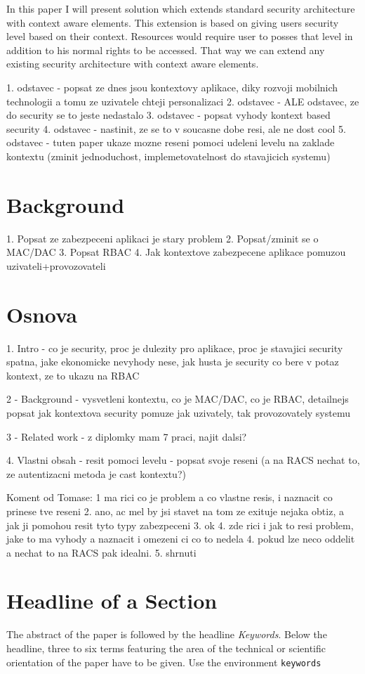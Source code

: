 \documentclass{poster15}
\begin{document}
In this paper I will present solution which extends standard security architecture with context aware elements. This extension is based on giving users security level based on their context. Resources would require user to posses that level in addition to his normal rights to be accessed. That way we can extend any existing security architecture with context aware elements.

1. odstavec - popsat ze dnes jsou kontextovy aplikace, diky rozvoji mobilnich technologii a tomu ze uzivatele chteji personalizaci
2. odstavec - ALE odstavec, ze do security se to jeste nedastalo
3. odstavec - popsat vyhody kontext based security
4. odstavec - nastinit, ze se to v soucasne dobe resi, ale ne dost cool
5. odstavec - tuten paper ukaze mozne reseni pomoci udeleni levelu na zaklade kontextu (zminit jednoduchost, implemetovatelnost do stavajicich systemu)

\section{Background}
1. Popsat ze zabezpeceni aplikaci je stary problem
2. Popsat/zminit se o MAC/DAC 
3. Popsat RBAC
4. Jak kontextove zabezpecene aplikace pomuzou uzivateli+provozovateli

\section{Osnova}
1. Intro - co je security, proc je dulezity pro aplikace, proc je stavajici security spatna, jake ekonomicke nevyhody nese, jak husta je security co bere v potaz kontext, ze to ukazu na RBAC

2 - Background - vysvetleni kontextu, co je MAC/DAC, co je RBAC, detailnejs popsat jak kontextova security pomuze jak uzivately, tak provozovately systemu

3 - Related work - z diplomky mam 7 praci, najit dalsi?

4. Vlastni obsah - resit pomoci levelu - popsat svoje reseni (a na RACS nechat to, ze autentizacni metoda je cast kontextu?)

Koment od Tomase:
1 ma rici co je problem a co vlastne resis, i naznacit co prinese tve reseni
2. ano, ac mel by jsi stavet na tom ze exituje nejaka obtiz, a jak ji pomohou resit tyto typy zabezpeceni
3. ok
4. zde rici i jak to resi problem, jake to ma vyhody a naznacit i omezeni ci co to nedela
4. pokud lze neco oddelit a nechat to na RACS pak idealni.
5. shrnuti

\section{Headline of a Section}
The abstract of the paper is followed by the headline \emph{Keywords}. Below the headline, three to six terms featuring the area of the technical or scientific orientation of the paper have to be given. Use the environment \verb+keywords+
 
\end{document}
